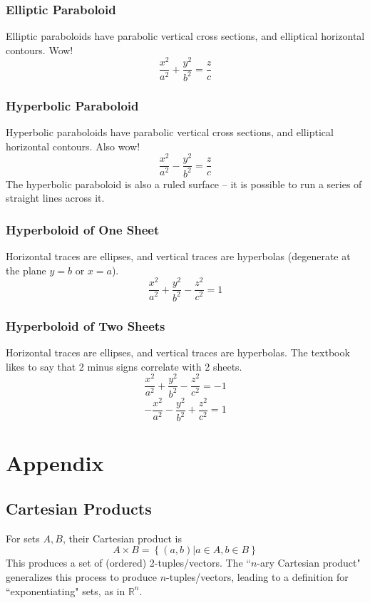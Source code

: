 \documentclass{article}
\begin{document}
\subsubsection{Elliptic Paraboloid}
Elliptic paraboloids have parabolic vertical cross sections, and elliptical horizontal contours. Wow!
$$\frac{x^2}{a^2} + \frac{y^2}{b^2} = \frac{z}{c}$$

\subsubsection{Hyperbolic Paraboloid}
Hyperbolic paraboloids have parabolic vertical cross sections, and elliptical horizontal contours. Also wow!
$$\frac{x^2}{a^2} - \frac{y^2}{b^2} = \frac{z}{c}$$
The hyperbolic paraboloid is also a ruled surface -- it is possible to run a series of straight lines across it.

\subsubsection{Hyperboloid of One Sheet}
Horizontal traces are ellipses, and vertical traces are hyperbolas (degenerate at the plane $y=b$ or $x=a$).
$$\frac{x^2}{a^2} + \frac{y^2}{b^2} - \frac{z^2}{c^2}=1$$

\subsubsection{Hyperboloid of Two Sheets}
Horizontal traces are ellipses, and vertical traces are hyperbolas. The textbook likes to say that 2 minus signs correlate with 2 sheets.
$$\frac{x^2}{a^2} + \frac{y^2}{b^2} - \frac{z^2}{c^2}= -1$$
$$-\frac{x^2}{a^2} - \frac{y^2}{b^2} + \frac{z^2}{c^2}= 1$$

\section{Appendix}
\subsection{Cartesian Products} \label{set-multiplication}
For sets $A, B$, their Cartesian product is $$A \times B = \left\{ (a,b) | a \in A, b \in B\right\}$$
This produces a set of (ordered) 2-tuples/vectors.
The ``$n$-ary Cartesian product" generalizes this process to produce $n$-tuples/vectors, leading to a definition for ``exponentiating" sets, as in $\mathbb{R}^n$.
\end{document}
